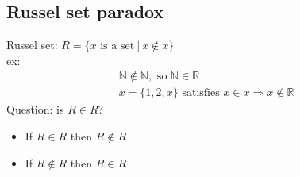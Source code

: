 \documentclass{article}
\begin{document}
\subsection{Russel set paradox}
Russel set: $R = \{x \text{ is a set} \ | \ x \notin x \}$\\
ex:
\begin{gather*}
    \mathbb{N} \notin \mathbb{N}, \text{ so } \mathbb{N} \in \mathbb{R} \\
    x = \{1,2,x\} \text{ satisfies } x \in x \Rightarrow x \notin \mathbb{R}
\end{gather*}
Question: is $R \in R$?
\begin{itemize}
    \item If $R \in R$ then $R \notin R$
    \item If $R \notin R$ then $R \in R$
\end{itemize}
\end{document}
